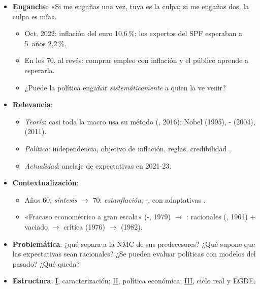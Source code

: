 \documentclass{article}
\begin{document}
\cabecerarepaso
\begin{columnas}

\begin{itemize}
\item \textbf{Enganche}: «Si me engañas una vez, tuya es la culpa; si me engañas dos, la culpa es mía».
  \begin{itemize}
  \item Oct. 2022: inflación del euro 10,6\,\%; los expertos del SPF esperaban a 5~años 2,2\,\%.
  \item En los 70, al revés: comprar empleo con inflación y el público aprende a esperarla.
  \item ¿Puede la política engañar \emph{sistemáticamente} a quien la ve venir?
  \end{itemize}
\item \textbf{Relevancia}:
  \begin{itemize}
  \item \emph{Teoría}: casi toda la macro usa su método (, 2016); Nobel  (1995), - (2004),  (2011).
  \item \emph{Política}: independencia, objetivo de inflación, reglas, credibilidad .
  \item \emph{Actualidad}: anclaje de expectativas en 2021-23.
  \end{itemize}
\item \textbf{Contextualización}:
  \begin{itemize}
  \item Años 60, \emph{síntesis}  $\to$ 70: \emph{estanflación}; -, con adaptativas .
  \item «Fracaso econométrico a gran escala» (-, 1979) $\to$ : racionales (, 1961) + vaciado $\to$ crítica (1976) $\to$  (1982).
  \end{itemize}
\item \textbf{Problemática}: ¿qué separa a la NMC de sus predecesores? ¿Qué supone que las expectativas sean racionales? ¿Se pueden evaluar políticas con modelos del pasado? ¿Qué queda?
\item \textbf{Estructura}: \hyperref[rep:I]{I}, caracterización; \hyperref[rep:II]{II}, política económica; \hyperref[rep:III]{III}, ciclo real y EGDE.
\end{itemize}

\end{columnas}
\end{document}
